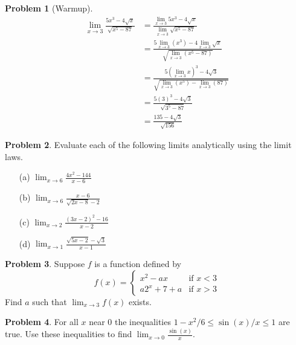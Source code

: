 \documentclass{article}
\theoremstyle{definition}
\newtheorem{Problem}{Problem}
\begin{document}
\begin{Problem}[Warmup]
  \begin{align*}
    \lim_{x \to 3} \frac{5x^3 - 4 \sqrt{x}}{\sqrt{x^5 - 87}} &= \frac{\lim_{x \to 3} 5x^3 - 4 \sqrt{x}}{\lim_{x \to 3}\sqrt{x^5 - 87}}\\
                                                             &= \frac{5\lim_{x \to 3}(x^3) - 4 \lim_{x \to 3}\sqrt{x}}{\sqrt{\lim_{x \to 3}(x^5 - 87)}}\\
                                                             &= \frac{5(\lim_{x \to 3}x)^3 - 4 \sqrt{3}}{\sqrt{\lim_{x \to 3}(x^5) - \lim_{x \to 3} (87)}}\\
                                                             &= \frac{5(3)^3 - 4 \sqrt{3}}{\sqrt{3^5 - 87}}\\
                                                             &= \frac{135 - 4\sqrt{3}}{\sqrt{156}}
  \end{align*}
\end{Problem}

\begin{Problem}
  Evaluate each of the following limits analytically using the limit laws.
  \begin{itemize}
    \item[(a)]
      $\displaystyle
        \lim_{x \to 6} \frac{4x^2 - 144}{x-6}
      $
    \item[(b)]
      $\displaystyle
        \lim_{x \to 6} \frac{x-6}{\sqrt{2x-8} - 2}
      $
    \item[(c)]
      $\displaystyle
        \lim_{x \to 2} \frac{(3x-2)^2 - 16}{x-2}
      $
    \item[(d)]
      $\displaystyle
        \lim_{x \to 1} \frac{\sqrt{5x-2} - \sqrt{3}}{x-1}
      $
  \end{itemize}
\end{Problem}

\begin{Problem}
  Suppose $f$ is a function defined by
  \[
    f(x) =
    \begin{cases}
      x^2 - ax & \mbox{if $x < 3$}\\
      a2^x + 7 + a & \mbox{if $x > 3$}
    \end{cases}
  \]
  Find $a$ such that $\lim_{x \to 3} f(x)$ exists.
\end{Problem}

\begin{Problem}
  For all $x$ near 0 the inequalities $1 - x^2/6 \le \sin(x)/x \le 1$ are true.
  Use these inequalities to find $\lim_{x \to 0} \frac{\sin(x)}{x}$.
\end{Problem}


\printbibliography
\end{document}

